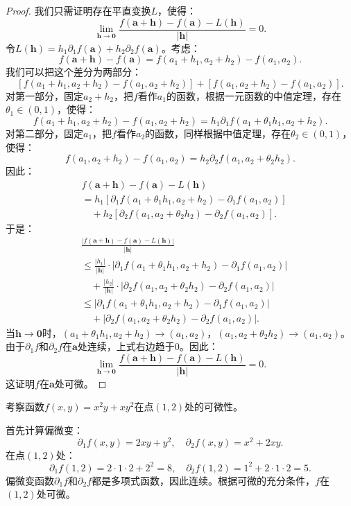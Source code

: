\documentclass[12pt,UTF8]{ctexbook}
\begin{document}
\begin{appendix}
\begin{proof}
我们只需证明存在平直变换$L$，使得：
$$ \lim_{\mathbf{h}\to\mathbf{0}} \frac{f(\mathbf{a}+\mathbf{h}) - f(\mathbf{a}) - L(\mathbf{h})}{|\mathbf{h}|} = 0. $$
令$L(\mathbf{h}) = h_1\partial_1 f(\mathbf{a}) + h_2\partial_2 f(\mathbf{a})$。考虑：
$$ f(\mathbf{a}+\mathbf{h}) - f(\mathbf{a}) = f(a_1+h_1,a_2+h_2) - f(a_1,a_2). $$
我们可以把这个差分为两部分：
$$ [f(a_1+h_1,a_2+h_2) - f(a_1,a_2+h_2)] + [f(a_1,a_2+h_2) - f(a_1,a_2)]. $$
对第一部分，固定$a_2+h_2$，把$f$看作$a_1$的函数，根据一元函数的中值定理，存在$\theta_1\in(0,1)$，使得：
$$ f(a_1+h_1,a_2+h_2) - f(a_1,a_2+h_2) = h_1\partial_1 f(a_1+\theta_1 h_1,a_2+h_2). $$
对第二部分，固定$a_1$，把$f$看作$a_2$的函数，同样根据中值定理，存在$\theta_2\in(0,1)$，使得：
$$ f(a_1,a_2+h_2) - f(a_1,a_2) = h_2\partial_2 f(a_1,a_2+\theta_2 h_2). $$
因此：
\begin{align*}
&f(\mathbf{a}+\mathbf{h}) - f(\mathbf{a}) - L(\mathbf{h}) \\
&= h_1[\partial_1 f(a_1+\theta_1 h_1,a_2+h_2) - \partial_1 f(a_1,a_2)] \\
&\quad + h_2[\partial_2 f(a_1,a_2+\theta_2 h_2) - \partial_2 f(a_1,a_2)].
\end{align*}
于是：
\begin{align*}
&\frac{|f(\mathbf{a}+\mathbf{h}) - f(\mathbf{a}) - L(\mathbf{h})|}{|\mathbf{h}|} \\
&\leq \frac{|h_1|}{|\mathbf{h}|}\cdot|\partial_1 f(a_1+\theta_1 h_1,a_2+h_2) - \partial_1 f(a_1,a_2)| \\
&\quad + \frac{|h_2|}{|\mathbf{h}|}\cdot|\partial_2 f(a_1,a_2+\theta_2 h_2) - \partial_2 f(a_1,a_2)| \\
&\leq |\partial_1 f(a_1+\theta_1 h_1,a_2+h_2) - \partial_1 f(a_1,a_2)| \\
&\quad + |\partial_2 f(a_1,a_2+\theta_2 h_2) - \partial_2 f(a_1,a_2)|.
\end{align*}
当$\mathbf{h}\to\mathbf{0}$时，$(a_1+\theta_1 h_1,a_2+h_2)\to(a_1,a_2)$，$(a_1,a_2+\theta_2 h_2)\to(a_1,a_2)$。由于$\partial_1 f$和$\partial_2 f$在$\mathbf{a}$处连续，上式右边趋于$0$。因此：
$$ \lim_{\mathbf{h}\to\mathbf{0}} \frac{f(\mathbf{a}+\mathbf{h}) - f(\mathbf{a}) - L(\mathbf{h})}{|\mathbf{h}|} = 0. $$
这证明$f$在$\mathbf{a}$处可微。
\end{proof}

\begin{et}
考察函数$f(x,y) = x^2y + xy^2$在点$(1,2)$处的可微性。
\end{et}

\begin{so}
首先计算偏微变：
$$ \partial_1 f(x,y) = 2xy + y^2, \quad \partial_2 f(x,y) = x^2 + 2xy. $$
在点$(1,2)$处：
$$ \partial_1 f(1,2) = 2\cdot1\cdot2 + 2^2 = 8, \quad \partial_2 f(1,2) = 1^2 + 2\cdot1\cdot2 = 5. $$
偏微变函数$\partial_1 f$和$\partial_2 f$都是多项式函数，因此连续。根据可微的充分条件，$f$在$(1,2)$处可微。


\end{so}
\end{appendix}
\end{document}
